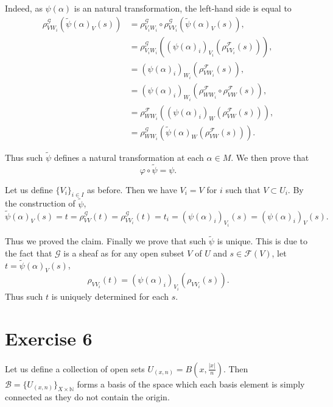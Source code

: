 \documentclass{article}
\begin{document}
Indeed, as $\psi(\alpha)$ is an natural transformation, the left-hand side is equal to
\begin{align*}
\rho_{VW_i}^{\mathcal{G}}(\tilde{\psi}(\alpha)_V(s))&=\rho_{V_iW_i}^{\mathcal{G}}\circ\rho_{VV_i}^{\mathcal{G}}(\tilde{\psi}(\alpha)_V(s)),\\
&=\rho_{V_iW_i}^{\mathcal{G}}((\psi(\alpha)_i)_{V_i}(\rho^{\mathcal{F}}_{VV_i}(s))),\\
&=(\psi(\alpha)_i)_{W_i}(\rho^{\mathcal{F}}_{VW_i}(s)),\\
&=(\psi(\alpha)_i)_{W_i}(\rho^{\mathcal{F}}_{WW_i}\circ\rho^{\mathcal{F}}_{VW}(s)),\\
&=\rho^{\mathcal{F}}_{WW_i}((\psi(\alpha)_i)_{W}(\rho^{\mathcal{F}}_{VW}(s))),\\
&=\rho^{\mathcal{G}}_{WW_i}(\tilde{\psi}(\alpha)_{W}(\rho^{\mathcal{F}}_{VW}(s))).
\end{align*}

Thus such $\tilde{\psi}$ defines a natural transformation at each $\alpha\in M$. We then prove that 
\begin{equation*}
\varphi\circ\tilde{\psi}=\psi.
\end{equation*}

Let us define $\{V_i\}_{i\in I}$ as before. Then we have $V_i = V$ for $i$ such that $V\subset U_i$. By the construction of $\tilde{\psi}$,
\begin{equation*}
\tilde{\psi}(\alpha)_V(s) = t=\rho^{\mathcal{G}}_{VV}(t)=\rho^{\mathcal{G}}_{VV_i}(t) = t_i = (\psi(\alpha)_i)_{V_i}(s)=(\psi(\alpha)_i)_{V}(s).
\end{equation*}

Thus we proved the claim. Finally we prove that such $\tilde{\psi}$ is unique. This is due to the fact that $\mathcal{G}$ is a sheaf as for any open subset $V$ of $U$ and $s\in\mathcal{F}(V)$, let $t=\tilde{\psi}(\alpha)_V(s)$, 
\begin{equation*}
\rho_{VV_i}(t) = (\psi(\alpha)_i)_{V_i}(\rho_{VV_i}(s)).
\end{equation*}
Thus such $t$ is uniquely determined for each $s$.

\section{Exercise 6}

Let us define a collection of open sets $U_{(x,n)} = B(x,{\frac {|x|} n})$. Then $\mathcal{B}=\{U_{(x,n)}\}_{X\times\mathbb{N}}$ forms a basis of the space which each basis element is simply connected as they do not contain the origin.\\
\end{document}
